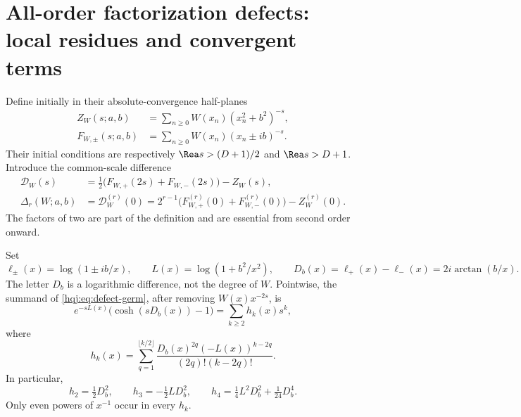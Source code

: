 \section{All-order factorization defects: local residues and convergent terms}
\label{hqj:sec:local}

Define initially in their absolute-convergence half-planes
\begin{align}
Z_W(s;a,b)&=\sum_{n\ge0}W(x_n)(x_n^2+b^2)^{-s},\label{hqj:eq:ZW}\\
F_{W,\pm}(s;a,b)&=\sum_{n\ge0}W(x_n)(x_n\pm ib)^{-s}.
\end{align}
Their initial conditions are respectively $\Rea s>(D+1)/2$ and
$\Rea s>D+1$. Introduce the common-scale difference
\begin{align}
\mathcal D_W(s)&=\tfrac12\bigl(F_{W,+}(2s)+F_{W,-}(2s)\bigr)-Z_W(s),
\label{hqj:eq:defect-germ}\\
\Delta_r(W;a,b)&=\mathcal D_W^{(r)}(0)
=2^{r-1}\bigl(F_{W,+}^{(r)}(0)+F_{W,-}^{(r)}(0)\bigr)-Z_W^{(r)}(0).
\label{hqj:eq:defect}
\end{align}
The factors of two are part of the definition and are essential from
second order onward.

Set
\begin{equation}\label{hqj:eq:logs}
\ell_\pm(x)=\log(1\pm ib/x),\qquad
L(x)=\log(1+b^2/x^2),\qquad
D_b(x)=\ell_+(x)-\ell_-(x)=2i\arctan(b/x).
\end{equation}
The letter $D_b$ is a logarithmic difference, not the degree of $W$.
Pointwise, the summand of \eqref{hqj:eq:defect-germ}, after removing
$W(x)x^{-2s}$, is
\begin{equation}\label{hqj:eq:cosh}
e^{-sL(x)}\bigl(\cosh(sD_b(x))-1\bigr)
=\sum_{k\ge2}h_k(x)s^k,
\end{equation}
where
\begin{equation}\label{hqj:eq:hk}
h_k(x)=\sum_{q=1}^{\lfloor k/2\rfloor}
\frac{D_b(x)^{2q}(-L(x))^{k-2q}}{(2q)!(k-2q)!}.
\end{equation}
In particular,
\[
h_2=\tfrac12D_b^2,\qquad h_3=-\tfrac12LD_b^2,
\qquad h_4=\tfrac14L^2D_b^2+\tfrac1{24}D_b^4.
\]
Only even powers of $x^{-1}$ occur in every $h_k$.

